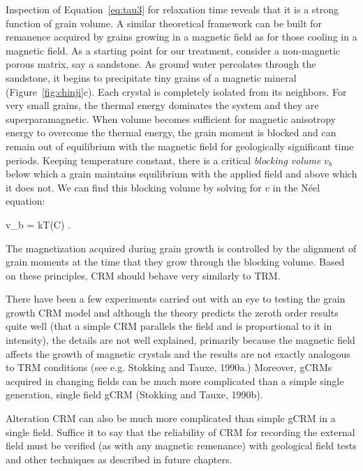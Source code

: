 Inspection of Equation~\ref{eq:tau3}
 for relaxation time reveals that it is a strong function
of grain volume.  A similar theoretical framework can be built for remanence
acquired by grains growing in a magnetic field as for those cooling in a
magnetic field.   
As a starting point for our  treatment, consider a non-magnetic
porous matrix, say a sandstone.  As ground water percolates through the
sandstone, it begins to precipitate tiny grains of a magnetic mineral (Figure~\ref{fig:chinji}c). 
  Each crystal is completely isolated from its neighbors.  For very
small grains, the thermal energy dominates the system  and they are superparamagnetic. 
When  volume becomes sufficient for
magnetic anisotropy energy to overcome the 
thermal energy, the grain moment is
blocked and can remain out of equilibrium with the magnetic field 
for geologically
significant time periods.    Keeping temperature constant, there is
a critical 
 {\it blocking volume} $v_b$ below which a grain maintains
equilibrium with the applied field and above which it does not.     We can find this blocking volume by solving for $v$ in the 
N\'eel equation:   

\beq
v_b = { {kT\ln (C\tau)}  }.
\label{eq:vb}
\eeq


\noindent  The
magnetization acquired during grain growth is controlled by the alignment of
grain moments at the time that they grow through the blocking volume.      
Based on these principles, 
CRM should behave very similarly to TRM.

 There have been a few experiments carried out with an eye to testing
the grain growth CRM model  and although the theory predicts the zeroth order results quite well
(that a simple CRM parallels the field and is proportional to it in intensity), the
details are not well explained, primarily because the magnetic field affects the growth
of magnetic crystals and the results are not exactly analogous to TRM conditions
(see e.g. Stokking and Tauxe, 1990a.)
\nocite{stokking90}
  Moreover, gCRMs acquired in  changing fields can be much more complicated than a simple single generation, single field gCRM (Stokking and Tauxe, 1990b). \nocite{stokking90b}    

Alteration CRM can also be much more complicated than simple gCRM in a single field.  Suffice it to say that the reliability of CRM for recording the external field must be verified (as with any magnetic remenance) with geological field tests  and other techniques as described in future chapters.  


